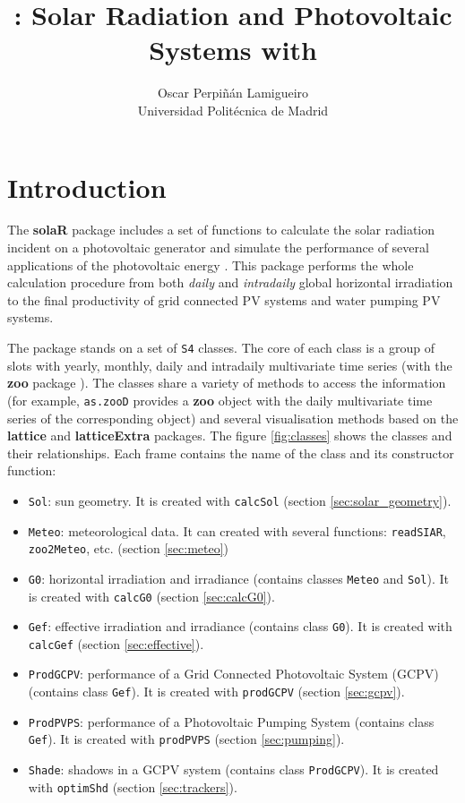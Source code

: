 \documentclass[a4paper]{article}
\title{\pkg{solaR}: Solar Radiation and Photovoltaic Systems with \proglang{R}}
\author{Oscar Perpiñán Lamigueiro\\Universidad Politécnica de Madrid}
\newcommand{\code}[1]{{\texttt{#1}}}
\newcommand{\pkg}[1]{{\textbf{#1}}}
\begin{document}
\section{Introduction}
\label{sec:introduction}

The  \pkg{solaR} package includes a set of functions to calculate
the solar radiation incident on a photovoltaic generator and simulate the 
performance of several applications of the photovoltaic energy \cite{Perpinan2011}.
This package performs the whole calculation procedure from both \emph{daily} and 
\emph{intradaily} global horizontal irradiation to the final productivity of 
grid connected PV systems and water pumping PV systems. 

The package stands on a set of \code{S4} classes. The core of each
class is a group of slots with yearly, monthly, daily and intradaily
multivariate time series (with the \pkg{zoo} package
\cite{Zeileis.Grothendieck2005}). The classes share a variety of
methods to access the information (for example, \code{as.zooD}
provides a \pkg{zoo} object with the daily multivariate time series of
the corresponding object) and several visualisation methods based on
the \pkg{lattice} \cite{Sarkar2010} and \pkg{latticeExtra}
\cite{Sarkar.Andrews2010} packages. The figure \ref{fig:classes}
shows the classes and their relationships. Each frame contains the
name of the class and its constructor function:

\begin{itemize}
\item \code{Sol}: sun geometry. It is created with \code{calcSol}
  (section \ref{sec:solar_geometry}).
\item \code{Meteo}: meteorological data. It can created with several
  functions: \code{readSIAR}, \code{zoo2Meteo}, etc. (section \ref{sec:meteo})
\item \code{G0}: horizontal irradiation and irradiance (contains
  classes \code{Meteo} and \code{Sol}). It is created with
  \code{calcG0} (section \ref{sec:calcG0}).
\item \code{Gef}: effective irradiation and irradiance (contains class
  \code{G0}). It is created with \code{calcGef} (section \ref{sec:effective}).
\item \code{ProdGCPV}: performance of a Grid Connected Photovoltaic
  System (GCPV) (contains class \code{Gef}). It is created with
  \code{prodGCPV} (section \ref{sec:gcpv}).
\item \code{ProdPVPS}: performance of a Photovoltaic Pumping System
  (contains class \code{Gef}). It is created with \code{prodPVPS}
  (section \ref{sec:pumping}).
\item \code{Shade}: shadows in a GCPV system (contains class
  \code{ProdGCPV}). It is created with \code{optimShd} (section
  \ref{sec:trackers}).
\end{itemize}
\end{document}
